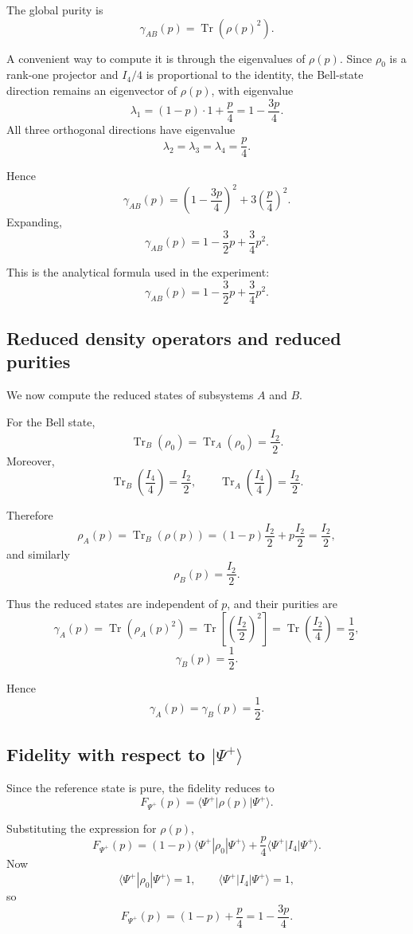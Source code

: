 \documentclass[a4paper]{article}
\begin{document}
The global purity is
\[
\gamma_{AB}(p) = \operatorname{Tr}(\rho(p)^2).
\]

A convenient way to compute it is through the eigenvalues of \(\rho(p)\). Since \(\rho_0\) is a rank-one projector and \(I_4/4\) is proportional to the identity, the Bell-state direction remains an eigenvector of \(\rho(p)\), with eigenvalue
\[
\lambda_1 = (1-p)\cdot 1 + \frac p4 = 1-\frac{3p}{4}.
\]
All three orthogonal directions have eigenvalue
\[
\lambda_2=\lambda_3=\lambda_4=\frac p4.
\]

Hence
\[
\gamma_{AB}(p)
=
\left(1-\frac{3p}{4}\right)^2 + 3\left(\frac p4\right)^2.
\]
Expanding,
\[
\gamma_{AB}(p)
=
1-\frac{3}{2}p+\frac{3}{4}p^2.
\]

This is the analytical formula used in the experiment:
\[
\gamma_{AB}(p)=1-\frac{3}{2}p+\frac{3}{4}p^2.
\]

\subsection*{Reduced density operators and reduced purities}

We now compute the reduced states of subsystems \(A\) and \(B\).

For the Bell state,
\[
\operatorname{Tr}_B(\rho_0)=\operatorname{Tr}_A(\rho_0)=\frac{I_2}{2}.
\]
Moreover,
\[
\operatorname{Tr}_B\!\left(\frac{I_4}{4}\right)=\frac{I_2}{2},
\qquad
\operatorname{Tr}_A\!\left(\frac{I_4}{4}\right)=\frac{I_2}{2}.
\]

Therefore
\[
\rho_A(p)=\operatorname{Tr}_B(\rho(p))
=
(1-p)\frac{I_2}{2}+p\frac{I_2}{2}
=
\frac{I_2}{2},
\]
and similarly
\[
\rho_B(p)=\frac{I_2}{2}.
\]

Thus the reduced states are independent of \(p\), and their purities are
\[
\gamma_A(p)=\operatorname{Tr}(\rho_A(p)^2)
=
\operatorname{Tr}\left[\left(\frac{I_2}{2}\right)^2\right]
=
\operatorname{Tr}\left(\frac{I_2}{4}\right)
=
\frac{1}{2},
\]
\[
\gamma_B(p)=\frac{1}{2}.
\]

Hence
\[
\gamma_A(p)=\gamma_B(p)=\frac12.
\]

\subsection*{Fidelity with respect to \texorpdfstring{$|\Psi^+\rangle$}{|Psi+>}}

Since the reference state is pure, the fidelity reduces to
\[
F_{\Psi^+}(p)
=
\langle\Psi^+|\rho(p)|\Psi^+\rangle.
\]

Substituting the expression for \(\rho(p)\),
\[
F_{\Psi^+}(p)
=
(1-p)\langle\Psi^+|\rho_0|\Psi^+\rangle
+
\frac p4 \langle\Psi^+|I_4|\Psi^+\rangle.
\]
Now
\[
\langle\Psi^+|\rho_0|\Psi^+\rangle = 1,
\qquad
\langle\Psi^+|I_4|\Psi^+\rangle = 1,
\]
so
\[
F_{\Psi^+}(p)
=
(1-p)+\frac p4
=
1-\frac{3p}{4}.
\]
\end{document}
